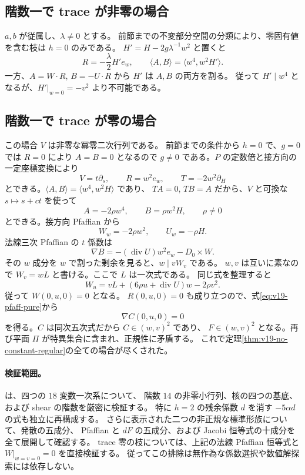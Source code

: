 \documentclass[11pt,a4paper]{ltjsarticle}
\theoremstyle{remark}\newtheorem{remark}[theorem]{注意}
\begin{document}
\subsection{階数一で trace が非零の場合}

$a,b$ が従属し、$\lambda\ne0$ とする。
前節までの不変部分空間の分類により、零固有値を含む枝は $h=0$ のみである。
$H'=H-2g\lambda^{-1}w^2$ と置くと
\[
 R=-\frac\lambda2H' e_w,
 \qquad \langle A,B\rangle=\langle w^4,w^2H'\rangle.
\]
一方、$A=W\cdot R$, $B=-U\cdot R$ から $H'$ は $A,B$ の両方を割る。
従って $H'\mid w^4$ となるが、$H'|_{w=0}=-v^2$ より不可能である。

\subsection{階数一で trace が零の場合}

この場合 $V$ は非零な冪零二次行列である。
前節までの条件から $h=0$ で、$g=0$ では $R=0$ により $A=B=0$ となるので
$g\ne0$ である。$P$ の定数倍と接方向の一定座標変換により
\[
 V=t\partial_s,\qquad R=w^2 e_w,\qquad
 T=-2w^2\partial_H
\]
とできる。$\langle A,B\rangle=\langle w^4,w^2H\rangle$ であり、
$TA=0$, $TB=A$ だから、$V$ と可換な $s\mapsto s+ct$ を使って
\[
 A=-2\rho w^4,\qquad B=\rho w^2H,\qquad\rho\ne0
\]
とできる。接方向 Pfaffian から
\[
 W_w=-2\rho w^2,\qquad U_w=-\rho H.
\]
法線三次 Pfaffian の $t$ 係数は
\[
 \nabla B=-(\operatorname{div}U)w^2e_w-D_0\times W.
\]
その $w$ 成分を $w$ で割った剰余を見ると、$w\mid vW_v$ である。
$w,v$ は互いに素なので $W_v=wL$ と書ける。ここで $L$ は一次式である。
同じ式を整理すると
\[
 W_u=vL+(6\rho u+\operatorname{div}U)w-2\rho v^2.
\]
従って $W(0,u,0)=0$ となる。
$R(0,u,0)=0$ も成り立つので、式\eqref{eq:v19-pfaff-pure}から
\[
                   \nabla C(0,u,0)=0
\]
を得る。$C$ は同次五次式だから $C\in(w,v)^2$ であり、
$F\in(w,v)^2$ となる。再び平面 $\Pi$ が特異集合に含まれ、正規性に矛盾する。
これで定理\ref{thm:v19-no-constant-regular}の全ての場合が尽くされた。

\paragraph{検証範囲。}
 は、四つの $18$ 変数一次系について、
階数 $14$ の非零小行列、核の四つの基底、および shear の階数を厳密に検証する。
特に $h=2$ の残余係数 $d$ を消す $-5\alpha d$ の式も独立に再構成する。
さらに表示された二つの非正規な標準形族について、発散の五成分、
Pfaffian と $dF$ の五成分、および Jacobi 恒等式の十成分を全て展開して確認する。
trace 零の枝については、上記の法線 Pfaffian 恒等式と
$W|_{w=v=0}=0$ を直接検証する。
従ってこの排除は無作為な係数選択や数値解探索には依存しない。
\end{document}
